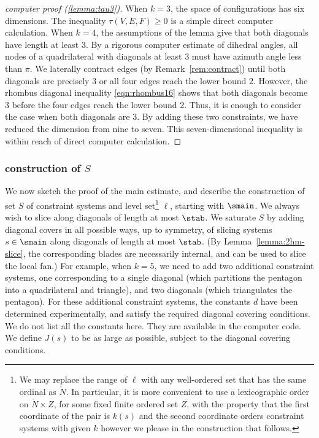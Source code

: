 \begin{proof}[computer proof (\ref{lemma:tau3})]
  When $k=3$, the space of configurations has six dimensions.  The
  inequality $\tau(V,E,F)\ge0$ is a simple direct computer calculation.  When
  $k=4$, the assumptions of the lemma give that both diagonals have
  length at least $3$.  By a rigorous computer estimate of dihedral
  angles, all nodes of a quadrilateral with diagonals at least $3$
  must have azimuth angle less than $\pi$.  We laterally contract edges (by
  Remark~\ref{rem:contract}) until both diagonals are precisely $3$ or
  all four edges reach the lower bound $2$.  However, the rhombus
  diagonal inequality \eqref{eqn:rhombus16} shows that both diagonals
  become $3$ before the four edges reach the lower bound $2$.  Thus,
  it is enough to consider the case when both diagonals are $3$.  By
  adding these two constraints, we have reduced the dimension from nine
  to seven. This seven-dimensional inequality is within reach of direct
  computer calculation.
\end{proof}


\subsubsection{construction of $S$}

We now sketch the proof of the main estimate, and describe the
construction of set $S$ of constraint systems and level
set\footnote{We may replace the range of $\ell$ with any
  well-ordered set that has the same ordinal as $\ring{N}$.  In
  particular, it is more convenient to use a lexicographic order on
  $\ring{N}\times Z$, for some fixed finite ordered set $Z$, with the
  property that the first coordinate of the pair is $k(s)$ and the
  second coordinate orders constraint systems with given $k$ however
  we please in the construction that follows.}  $\ell$, starting with
$\smain$.  We always wish to slice along diagonals of length at most
$\stab$.  We saturate $S$ by adding diagonal covers in all possible
ways, up to symmetry, of slicing systems $s\in \smain$ along diagonals
of length at most $\stab$.  (By Lemma~\ref{lemma:2hm-slice}, the
corresponding blades are necessarily internal, and can be used to
slice the local fan.)  For example, when $k=5$, we need to add two
additional constraint systems, one corresponding to a
single diagonal (which partitions the pentagon into a quadrilateral
and triangle), and two diagonals (which triangulates the pentagon).
For these additional constraint systems, the constants $d$ have been
determined experimentally, and satisfy the required diagonal covering
conditions.  We do not list all the constants here.  They are
available in the computer code.  We define $J(s)$ to be as large as
possible, subject to the diagonal covering conditions.

